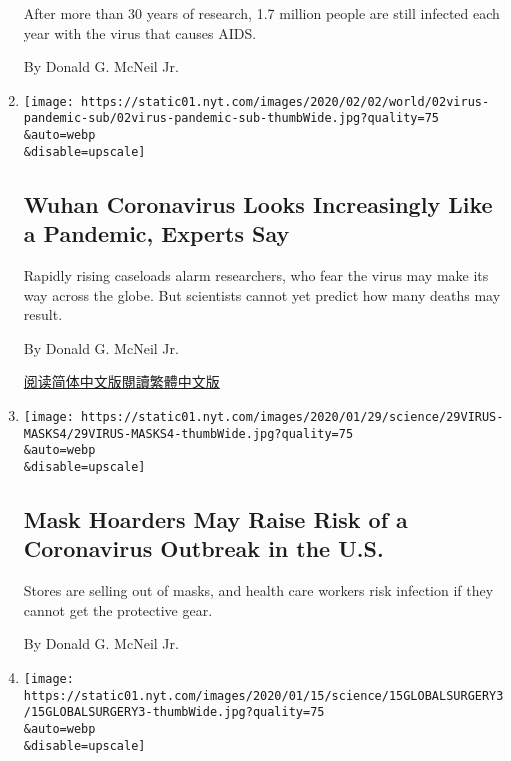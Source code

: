 \begin{enumerate}
  After more than 30 years of research, 1.7 million people are still
  infected each year with the virus that causes AIDS.

  By Donald G. McNeil Jr.
\item
  \href{/2020/02/02/health/coronavirus-pandemic-china.html}{}

  \texttt{[image: https://static01.nyt.com/images/2020/02/02/world/02virus-pandemic-sub/02virus-pandemic-sub-thumbWide.jpg?quality=75\\\&auto=webp\\\&disable=upscale]}

  \hypertarget{wuhan-coronavirus-looks-increasingly-like-a-pandemic-experts-say}{%
  \subsection{Wuhan Coronavirus Looks Increasingly Like a Pandemic,
  Experts
  Say}\label{wuhan-coronavirus-looks-increasingly-like-a-pandemic-experts-say}}

  Rapidly rising caseloads alarm researchers, who fear the virus may
  make its way across the globe. But scientists cannot yet predict how
  many deaths may result.

  By Donald G. McNeil Jr.

  \href{https://cn.nytimes.com/china/20200203/coronavirus-pandemic-china/}{阅读简体中文版}\href{https://cn.nytimes.com/china/20200203/coronavirus-pandemic-china/zh-hant/}{閱讀繁體中文版}
\item
  \href{/2020/01/29/health/coronavirus-masks-hoarding.html}{}

  \texttt{[image: https://static01.nyt.com/images/2020/01/29/science/29VIRUS-MASKS4/29VIRUS-MASKS4-thumbWide.jpg?quality=75\\\&auto=webp\\\&disable=upscale]}

  \hypertarget{mask-hoarders-may-raise-risk-of-a-coronavirus-outbreak-in-the-us}{%
  \subsection{Mask Hoarders May Raise Risk of a Coronavirus Outbreak in
  the
  U.S.}\label{mask-hoarders-may-raise-risk-of-a-coronavirus-outbreak-in-the-us}}

  Stores are selling out of masks, and health care workers risk
  infection if they cannot get the protective gear.

  By Donald G. McNeil Jr.
\item
  \href{/2020/01/15/health/surgeons-checklists.html}{}

  \texttt{[image: https://static01.nyt.com/images/2020/01/15/science/15GLOBALSURGERY3/15GLOBALSURGERY3-thumbWide.jpg?quality=75\\\&auto=webp\\\&disable=upscale]}


\end{enumerate}
